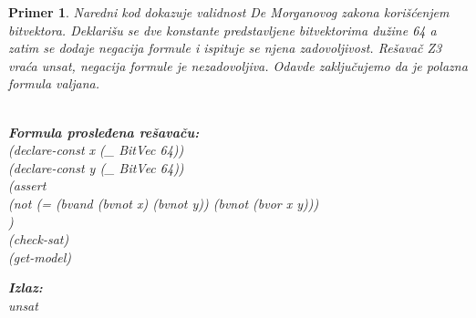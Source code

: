 \documentclass[12pt,oneside]{memoir}
\newcommand\tab[1][0.5cm]{\hspace*{#1}}
\newtheorem{primer}{Primer}
\begin{document}
\begin{primer} Naredni kod dokazuje validnost De Morganovog zakona korišćenjem bitvektora. Deklarišu se dve konstante predstavljene bitvektorima dužine 64 a zatim se dodaje negacija formule i ispituje se njena zadovoljivost. Rešavač Z3 vraća unsat, negacija formule je nezadovoljiva.
Odavde zaključujemo da je polazna formula valjana.
\\ \\
\hspace{9.5cm}
\begin{minipage}[t]{0.7\textwidth}
\textbf{Formula prosleđena rešavaču:}
\\(declare-const x (\_ BitVec 64))
\\(declare-const y (\_ BitVec 64))
\\(assert 
\\\tab(not (= (bvand (bvnot x) (bvnot y)) (bvnot (bvor x y)))
\\)
\\(check-sat)
\\(get-model)
\end{minipage}
\hspace{1cm}
\begin{minipage}[t]{0.4\textwidth}
\vspace{-0.25cm}
\textbf{Izlaz:}
\\unsat
\end{minipage}
\end{primer}
\end{document}
